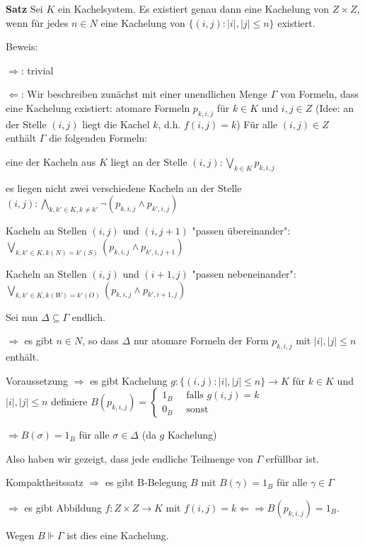 \documentclass[a4paper]{article}
\renewcommand{\note}[2]{\begin{noteBox} \textbf{#1} #2 \end{noteBox}}
\begin{document}
\begin{multicols}{3}
  \note{Satz}{Sei $K$ ein Kachelsystem. Es existiert genau dann eine Kachelung von $Z\times Z$, wenn für jedes $n\in N$ eine Kachelung von $\{(i,j) :|i|,|j| \leq n\}$ existiert.}

  Beweis:
  \begin{itemize*}
    \item $\Rightarrow$: trivial
    \item $\Leftarrow$: Wir beschreiben zunächst mit einer unendlichen Menge $\Gamma$ von Formeln, dass eine Kachelung existiert:
    atomare Formeln $p_{k,i,j}$ für $k\in K$ und $i,j\in Z$ (Idee: an der Stelle $(i,j)$ liegt die Kachel $k$, d.h. $f(i,j) =k$)
    Für alle $(i,j)\in Z$ enthält $\Gamma$ die folgenden Formeln:
    \begin{itemize*}
      \item eine der Kacheln aus $K$ liegt an der Stelle $(i,j):\bigvee_{k\in K} p_{k,i,j}$
      \item es liegen nicht zwei verschiedene Kacheln an der Stelle $(i,j): \bigwedge_{k,k'\in K,k\not=k'} \lnot(p_{k,i,j}\wedge p_{k',i,j})$
      \item Kacheln an Stellen $(i,j)$ und $(i,j+1)$ "passen übereinander": $\bigvee_{k,k'\in K,k(N)=k'(S)} (p_{k,i,j}\wedge p_{k',i,j+1})$
      \item Kacheln an Stellen $(i,j)$ und $(i+1,j)$ "passen nebeneinander": $\bigvee_{k,k'\in K,k(W)=k'(O)} (p_{k,i,j}\wedge p_{k',i+1,j})$
    \end{itemize*}
  \end{itemize*}

  Sei nun $\Delta\subseteq\Gamma$ endlich.
  \begin{itemize*}
    \item $\Rightarrow$ es gibt $n\in N$, so dass $\Delta$ nur atomare Formeln der Form $p_{k,i,j}$ mit $|i|,|j|\leq n$ enthält.
    \item Voraussetzung $\Rightarrow$ es gibt Kachelung $g:\{(i,j) :|i|,|j| \leq n\}\rightarrow K$ für $k\in K$ und $|i|,|j|\leq n$ definiere $B(p_{k,i,j}) = \begin{cases} 1_B \quad\text{ falls } g(i,j) =k \\ 0_B \quad\text{ sonst} \end{cases}$
    \item $\Rightarrow B(\sigma) = 1_B$ für alle $\sigma\in\Delta$ (da $g$ Kachelung)
    \item Also haben wir gezeigt, dass jede endliche Teilmenge von $\Gamma$ erfüllbar ist.
    \item Kompaktheitssatz $\Rightarrow$ es gibt B-Belegung $B$ mit $B(\gamma) = 1_B$ für alle $\gamma\in\Gamma$
    \item $\Rightarrow$ es gibt Abbildung $f:Z\times Z\rightarrow K$ mit $f(i,j) =k \Leftarrow\Rightarrow B(p_{k,i,j}) = 1_B$.
    \item Wegen $B\Vdash\Gamma$ ist dies eine Kachelung.
  \end{itemize*}


\end{multicols}
\end{document}
